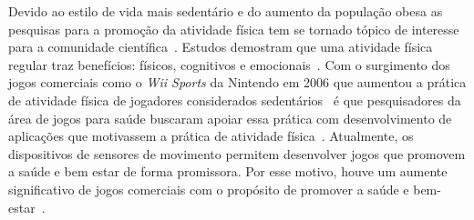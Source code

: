 Devido ao estilo de vida mais sedentário e do aumento da população obesa as pesquisas para a promoção da atividade física tem se tornado tópico de interesse para a comunidade científica~\cite{maitland2009,bartolome11,Mandryk2014}. Estudos demostram que uma atividade física regular traz benefícios: físicos, cognitivos e emocionais~\cite{Mandryk2014}. Com o surgimento dos jogos comerciais como o \textit{Wii Sports} da Nintendo em 2006 que aumentou a prática de atividade física de jogadores considerados sedentários~\cite{wiigraves2008} é que pesquisadores da área de jogos para saúde buscaram apoiar essa prática com desenvolvimento de aplicações que motivassem a prática de atividade física~\cite{stacey2011}. Atualmente, os dispositivos de sensores de movimento permitem desenvolver jogos que promovem a saúde e bem estar de forma promissora. Por esse motivo, houve um aumente significativo de jogos comerciais com o propósito de promover a saúde e bem-estar~\cite{Papastergiou:2009:EPC:1570538.
1570707}.





